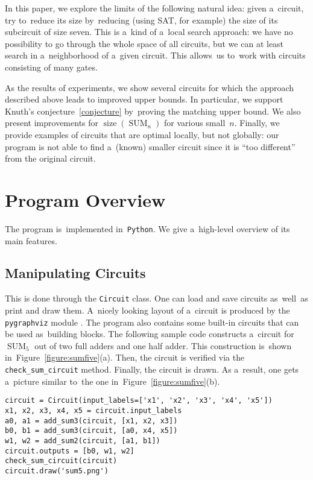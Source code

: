 \documentclass[12pt,letterpaper]{article}
\DeclareMathOperator{\SUM}{SUM}
\DeclareMathOperator{\size}{size}
\begin{document}
In this paper, we explore the limits of the following natural idea: given a~circuit, try to~reduce its size by~reducing (using SAT, for example) the size of its subcircuit of size seven. This is a~kind of a~local search approach: we have no possibility to go through the whole space of all circuits, but we can at least
search in a~neighborhood of a~given circuit. 
This allows~us to~work with circuits consisting
of many gates. 

As the results of experiments, we show several circuits
for which the approach described above leads to improved upper bounds. In particular, we support Knuth's conjecture~\eqref{conjecture} by~proving the matching upper bound. We also present improvements for $\size(\SUM_n)$ for various small~$n$. 
Finally, we provide examples of circuits that are
optimal locally, but not globally: our program is not able to find a~(known) smaller circuit since it is 
``too different'' from the original circuit.






\section{Program Overview}
The program is~implemented in~\texttt{Python}.
We give a~high-level overview of its main features.

\subsection{Manipulating Circuits}
This is done through the \texttt{Circuit}
class. One can load and save circuits as~well~as
print and draw them. A~nicely looking layout of
a~circuit is produced by the \texttt{pygraphviz} module \cite{}. The program also contains some built-in
circuits that can be used as~building blocks.
The following sample code constructs a~circuit
for $\SUM_5$ out of two full adders and 
one half adder. This construction is~shown 
in~Figure~\ref{figure:sumfive}(a). Then, 
the circuit is verified via the  
\texttt{check_sum_circuit} method. 
Finally, the circuit is drawn. As a~result, one gets
a~picture similar to~the one in~Figure~\ref{figure:sumfive}(b).

\begin{verbatim}
circuit = Circuit(input_labels=['x1', 'x2', 'x3', 'x4', 'x5'])
x1, x2, x3, x4, x5 = circuit.input_labels
a0, a1 = add_sum3(circuit, [x1, x2, x3])
b0, b1 = add_sum3(circuit, [a0, x4, x5])
w1, w2 = add_sum2(circuit, [a1, b1])
circuit.outputs = [b0, w1, w2]
check_sum_circuit(circuit)
circuit.draw('sum5.png')
\end{verbatim}
\end{document}
